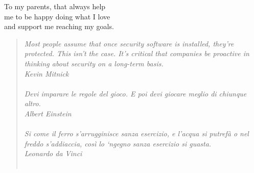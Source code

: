 \documentclass[a4paper, 12pt, twoside, openright]{book}
\newenvironment{abstract}{\cleardoublepage \null \vfill \begin{center}\bfseries\abstractname \end{center}}{\vfill\null}
\begin{document}
\cleardoublepage %
\thispagestyle{empty} %
\null
\vspace{2cm}
\begin{flushright}
 To my parents, that always help\\
me to be happy doing what I love\\
and support me reaching my goals.
\end{flushright}
\vfill
\cleardoublepage %
\null
\vspace{2cm}
\thispagestyle{empty}
\begin{quote}
  \textit{Most people assume that once security software is installed, they're protected. 
This isn't the case. It's critical that companies be proactive in thinking about security on a long-term basis.\\
Kevin Mitnick\\\\
Devi imparare le regole del gioco. E poi devi giocare meglio di chiunque altro.\\
Albert Einstein\\\\
Si come il ferro s'arrugginisce sanza esercizio, e l'acqua si putrefà o nel freddo s'addiaccia, così lo ‘ngegno sanza esercizio si guasta.\\
Leonardo da Vinci\\\\}
\end{quote}
\vfill
\null


%
\begingroup %
  \makeatletter
  \let\ps@plain\ps@empty
  \makeatother
  \tableofcontents  
  \clearpage
\endgroup

\mainmatter



\end{document}
